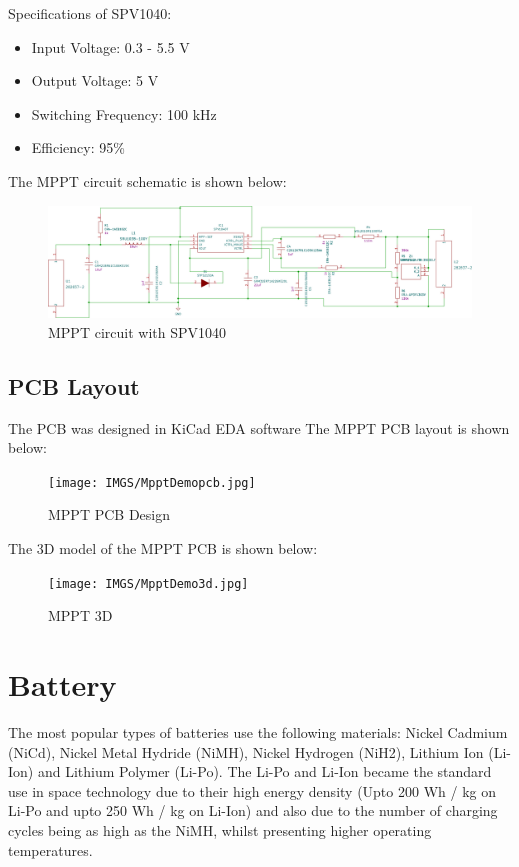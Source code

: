Specifications of  SPV1040:
	\begin{itemize}
	\item Input Voltage: 0.3 - 5.5 V
	\item Output Voltage: 5 V
	\item Switching Frequency: 100 kHz
	\item Efficiency: 95\%
\end{itemize}
The MPPT circuit schematic is shown below:
 	\begin{figure}[h]
	\centering
	\includegraphics[width=\columnwidth]{IMGS/MpptDemoBoard.pdf}
	\caption{MPPT circuit with SPV1040}
	\label{fig:mpptsch}
\end{figure}
\subsection{PCB Layout}
The PCB was designed in KiCad EDA software
The MPPT PCB layout is shown below:
\begin{figure}[H]
	\centering
	\texttt{[image: IMGS/MpptDemopcb.jpg]}
	\caption{MPPT PCB Design}
	\label{fig:mpptpcb}
\end{figure}

The 3D model of the MPPT PCB is shown below:
\begin{figure}[H]
	\centering
	\texttt{[image: IMGS/MpptDemo3d.jpg]}
	\caption{MPPT 3D}
	\label{fig:mppt3d}
\end{figure}





\section[Battery]{Battery}
The most popular types of batteries use the following materials: Nickel Cadmium
(NiCd), Nickel Metal Hydride (NiMH), Nickel Hydrogen (NiH2), Lithium Ion
(Li-Ion) and Lithium Polymer (Li-Po). The Li-Po and Li-Ion became the standard use in space technology due to their
high energy density (Upto 200 Wh / kg on Li-Po and upto 250 Wh / kg on Li-Ion) and also due to
the number of charging cycles being as high as the NiMH, whilst presenting higher
operating temperatures. 
